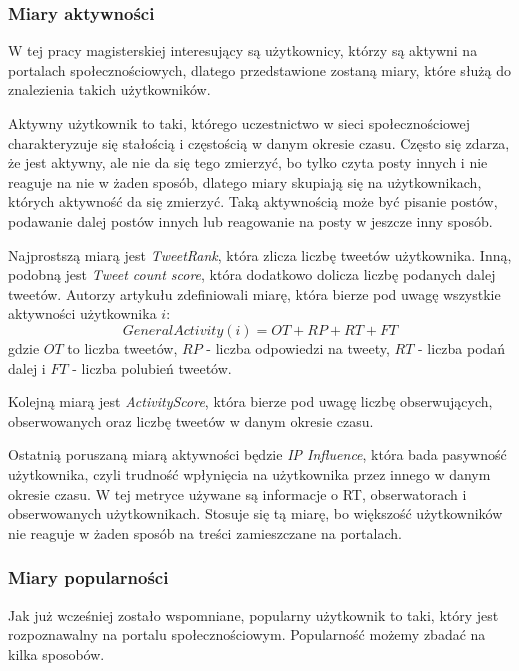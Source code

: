 \documentclass[polish,12pt]{aghthesis}
\begin{document}
\subsubsection{Miary aktywności}
W tej pracy magisterskiej interesujący są użytkownicy, którzy są aktywni na portalach społecznościowych, dlatego przedstawione zostaną miary, które służą do znalezienia takich użytkowników. 

Aktywny użytkownik to taki, którego uczestnictwo w sieci społecznościowej charakteryzuje się stałością i częstością w danym okresie czasu. Często się zdarza, że jest aktywny, ale nie da się tego zmierzyć, bo tylko czyta posty innych i nie reaguje na nie w żaden sposób, dlatego miary skupiają się na użytkownikach, których aktywność da się zmierzyć. Taką aktywnością może być pisanie postów, podawanie dalej postów innych lub reagowanie na posty w jeszcze inny sposób.

Najprostszą miarą jest \textit{TweetRank}\cite{acTweetRank}, która zlicza liczbę tweetów użytkownika. Inną, podobną jest \textit{Tweet count score}\cite{acTweetCountScore}, która dodatkowo dolicza liczbę podanych dalej tweetów. Autorzy artykułu\cite{measure} zdefiniowali miarę, która bierze pod uwagę wszystkie aktywności użytkownika $i$: 
\begin{equation}
General Activity(i) = OT + RP + RT + FT \label{n1}
\end{equation}
gdzie $OT$ to liczba tweetów, $RP$ - liczba odpowiedzi na tweety, $RT$ - liczba podań dalej i $FT$ - liczba polubień tweetów.

Kolejną miarą jest \textit{ActivityScore}\cite{acActivitytScore}, która bierze pod uwagę liczbę obserwujących, obserwowanych oraz liczbę tweetów w danym okresie czasu.

Ostatnią poruszaną miarą aktywności będzie \textit{IP Influence}\cite{acIPInfluence}, która bada pasywność użytkownika, czyli trudność wpłynięcia na użytkownika przez innego w danym okresie czasu. W tej metryce używane są informacje o RT, obserwatorach i obserwowanych użytkownikach. Stosuje się tą miarę, bo większość użytkowników nie reaguje w żaden sposób na treści zamieszczane na portalach.


\subsubsection{Miary popularności}
Jak już wcześniej zostało wspomniane, popularny użytkownik to taki, który jest rozpoznawalny na portalu społecznościowym. Popularność możemy zbadać na kilka sposobów. 
\end{document}
